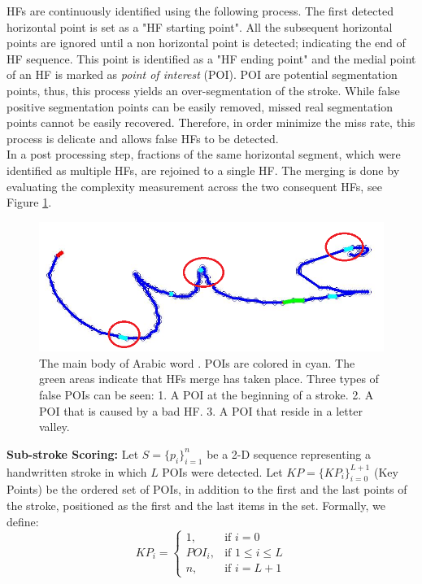 \documentclass[10pt, conference, compsocconf]{IEEEtran}
\begin{document}
HFs are continuously identified using the following process.
The first detected horizontal point is set as a "HF starting point". 
All the subsequent horizontal points are ignored until a non horizontal point is detected; indicating the end of HF sequence. 
This point is identified as a "HF ending point" and the medial point of an HF is marked as \emph{point of interest} (POI). 
POI are potential segmentation points, thus, this process yields an over-segmentation of the stroke. 
While false positive segmentation points can be easily removed, missed real segmentation points cannot be easily recovered. 
Therefore, in order minimize the miss rate, this process is delicate and allows false HFs to be detected.\\

In a post processing step, fractions of the same horizontal segment, which were identified as multiple HFs, are rejoined to a single HF. 
The merging is done by evaluating the complexity measurement across the two consequent HFs, see Figure \ref{fig:candidate_in_no_horizontal}.\\

\begin{figure}
\centering
\includegraphics[width=0.4\columnwidth]{./figures/candidate_in_no_horizontal}
\caption{The main body of Arabic word . POIs are colored in cyan. The green areas indicate that HFs merge has taken place. Three types of false POIs can be seen: 1. A POI at the beginning of a stroke. 2. A POI that is caused by a bad HF. 3. A POI that reside in a letter valley. }
\label{fig:candidate_in_no_horizontal}
\end{figure}

\textbf{Sub-stroke Scoring:}
Let $S=\{p_{i}\}_{i=1}^{n}$ be a 2-D sequence representing a handwritten stroke in which $L$ POIs were detected. 
Let $KP=\{KP_{i}\}_{i=0}^{L+1}$ (Key Points) be the ordered set of POIs, in addition to the first and the last points of the stroke, positioned as the first and the last items in the set.
Formally, we define: 
\begin{equation}
KP_{i} =\begin{cases}    1		, & \mbox{if } i=0 \\
							   POI_{i}	, & \mbox{if } 1\leq i \leq L \\
							   n    , & \mbox{if } i=L+1 
			\end{cases}				
\end{equation}
\end{document}
